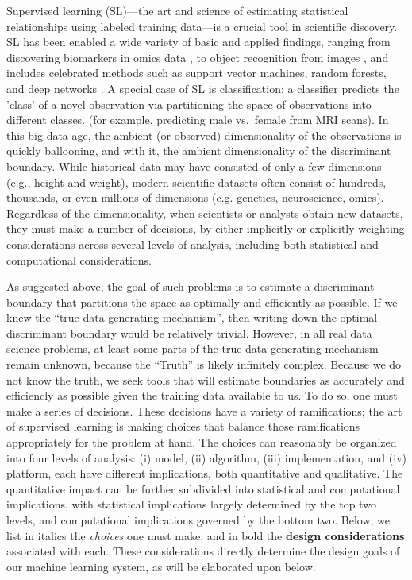 \documentclass[10pt]{article}
\begin{document}
\vspace{15pt}

\clearpage
\linenumbers


Supervised learning (SL)---the art and science of estimating statistical relationships using labeled training data---is a crucial tool in scientific discovery.  SL has been enabled a wide variety of basic and applied findings, ranging from discovering biomarkers in omics data \cite{Vogelstein2014a}, to object recognition from images \cite{Krizhevsky2012}, and includes celebrated methods such as support vector machines, random forests, and deep networks \cite{Hastie2004}.  A special case of SL is classification; a classifier  predicts the 'class' of a novel observation via partitioning the space of observations into different classes. 
(for example, predicting male vs.~female from MRI scans).  
In this big data age,  the ambient (or observed) dimensionality of the observations is quickly ballooning, and with it, the ambient dimensionality of the discriminant boundary.  While historical data may have consisted of only a few dimensions (e.g., height and weight), modern scientific datasets often consist of hundreds, thousands, or even millions of dimensions (e.g. genetics, neuroscience, omics). 
Regardless of the dimensionality, when  scientists or analysts obtain new datasets, they must make a number of decisions, by either implicitly or explicitly weighting considerations across several levels of analysis, including both statistical and computational considerations. 

As suggested above, the goal of such problems is to estimate a discriminant boundary that  partitions the space as optimally and efficiently  as possible. If we knew the ``true data generating mechanism'', then writing down the optimal discriminant boundary would be relatively trivial.  However, in all real data science problems, at least some parts of the true data generating mechanism remain unknown, because the ``Truth'' is likely infinitely complex.  Because we do not know the truth, we seek tools that will estimate boundaries as accurately and efficiencly as possible given the training data available to us.  To do so, one must make a series of decisions. These decisions have a variety of ramifications; the art of supervised learning is making choices that balance those ramifications appropriately for the problem at hand.  The choices can reasonably be organized into four levels of analysis: (i) model, (ii) algorithm, (iii) implementation, and (iv) platform, each have different implications, both quantitative and qualitative.  The quantitative impact can be further subdivided into statistical and computational implications, with statistical implications largely determined by the top two levels, and computational implications governed by the bottom two.   
Below, we list in italics the \emph{choices} one must make, and in bold the \textbf{design considerations} associated with each.  These considerations directly determine the design goals of our machine learning system, as will be elaborated upon below.
\end{document}
